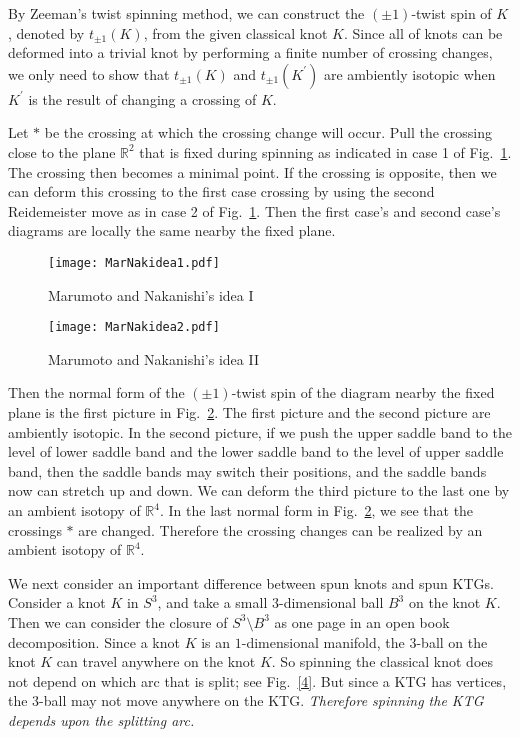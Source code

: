 \documentclass{amsart}
\theoremstyle{definition}
\theoremstyle{remark}
\numberwithin{equation}{section}
\begin{document}

By Zeeman's twist spinning method, we can construct the $(\pm1)$-twist spin of $K$, denoted by $t_{\pm1}(K)$, from the given classical knot $K$. Since all of knots can be deformed into a trivial knot by performing a finite number of crossing changes, we only need to show that $t_{\pm1}(K)$ and $t_{\pm1}(K^{'})$ are ambiently isotopic when $K^{'}$ is the result of changing a crossing of $K$.

Let $*$ be the crossing at which the crossing change will occur. Pull the crossing close to the plane $\mathbb{R}^{2}$ that is fixed during spinning as indicated in case 1 of Fig.~\ref{2}. The crossing then becomes a minimal point. If the crossing is opposite, then we can deform this crossing to the first case crossing by using the second Reidemeister move as in case 2 of Fig.~\ref{2}. Then the first case's and second case's diagrams are locally the same nearby the fixed plane.

\begin{figure}[h]
\texttt{[image: MarNakidea1.pdf]}
\caption{Marumoto and Nakanishi's idea I}
\label{2}
\end{figure}

\begin{figure}
\texttt{[image: MarNakidea2.pdf]}
\caption{Marumoto and Nakanishi's idea II}
\label{3}
\end{figure}

Then the normal form of the $(\pm1)$-twist spin of the diagram nearby the fixed plane is the first picture in Fig.~\ref{3}. The first picture and the second picture are ambiently isotopic. In the second picture, if we push the upper saddle band to the level of lower saddle band and the lower saddle band to the level of upper saddle band, then the saddle bands may switch their positions, and the saddle bands now can stretch up and down. We can deform the third picture to the last one by an ambient isotopy of $\mathbb{R}^{4}$. In the last normal form in Fig.~\ref{3}, we see that the crossings $*$ are changed. Therefore the crossing changes can be realized by an ambient isotopy of $\mathbb{R}^{4}$.

We next consider an important difference between spun knots and spun KTGs. Consider a knot $K$ in $S^{3}$, and take a small $3$-dimensional ball $B^{3}$ on the knot $K$. Then we can consider the closure of $S^{3} \setminus B^{3}$ as one page in an open book decomposition. Since a knot $K$ is an $1$-dimensional manifold, the $3$-ball on the knot $K$ can travel anywhere on the knot $K$. So spinning the classical knot does not depend on which arc that is split; 
see Fig.~\ref{4}. But since a KTG has vertices, the $3$-ball may not move anywhere on the KTG. \emph{Therefore spinning the KTG  depends upon the splitting arc.}
\end{document}
